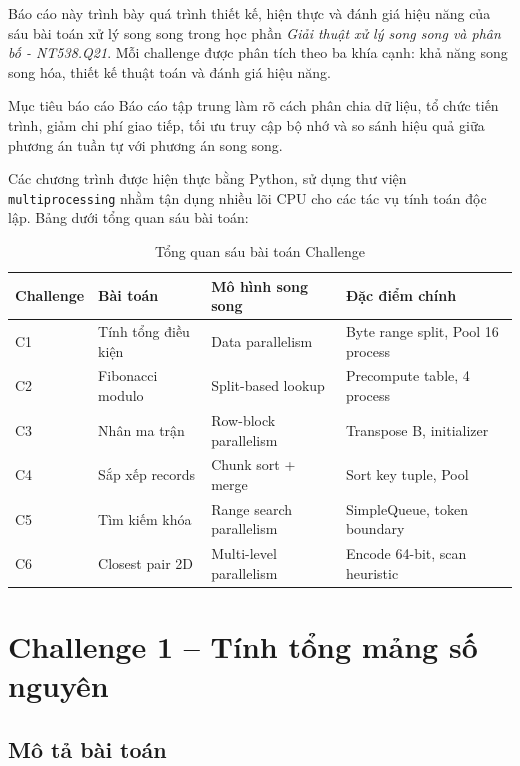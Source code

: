 \documentclass[12pt,a4paper]{article}
\newcommand{\CourseName}{Giải thuật xử lý song song và phân bố - NT538.Q21}
\begin{document}
Báo cáo này trình bày quá trình thiết kế, hiện thực và đánh giá hiệu năng của sáu bài toán xử lý song song trong học phần \textit{\CourseName}. Mỗi challenge được phân tích theo ba khía cạnh: khả năng song song hóa, thiết kế thuật toán và đánh giá hiệu năng.

\begin{academicbox}{Mục tiêu báo cáo}
Báo cáo tập trung làm rõ cách phân chia dữ liệu, tổ chức tiến trình, giảm chi phí giao tiếp, tối ưu truy cập bộ nhớ và so sánh hiệu quả giữa phương án tuần tự với phương án song song.
\end{academicbox}

Các chương trình được hiện thực bằng Python, sử dụng thư viện \texttt{multiprocessing} nhằm tận dụng nhiều lõi CPU cho các tác vụ tính toán độc lập. Bảng dưới tổng quan sáu bài toán:

\begin{table}[H]
\centering
\caption{Tổng quan sáu bài toán Challenge}
\begin{tabularx}{\textwidth}{p{2.2cm}p{3.8cm}p{3cm}p{2.2cm}}
\toprule
\textbf{Challenge} & \textbf{Bài toán} & \textbf{Mô hình song song} & \textbf{Đặc điểm chính} \\
\midrule
C1 & Tính tổng điều kiện & Data parallelism & Byte range split, Pool 16 process \\
C2 & Fibonacci modulo & Split-based lookup & Precompute table, 4 process \\
C3 & Nhân ma trận & Row-block parallelism & Transpose B, initializer \\
C4 & Sắp xếp records & Chunk sort + merge & Sort key tuple, Pool \\
C5 & Tìm kiếm khóa & Range search parallelism & SimpleQueue, token boundary \\
C6 & Closest pair 2D & Multi-level parallelism & Encode 64-bit, scan heuristic \\
\bottomrule
\end{tabularx}
\end{table}

\section{Challenge 1 -- Tính tổng mảng số nguyên}

\subsection{Mô tả bài toán}
\end{document}
